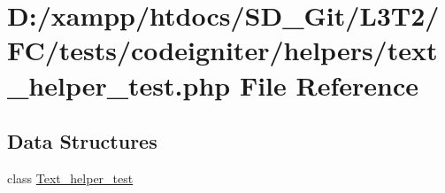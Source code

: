 \hypertarget{tests_2codeigniter_2helpers_2text__helper__test_8php}{}\section{D\+:/xampp/htdocs/\+S\+D\+\_\+\+Git/\+L3\+T2/\+F\+C/tests/codeigniter/helpers/text\+\_\+helper\+\_\+test.php File Reference}
\label{tests_2codeigniter_2helpers_2text__helper__test_8php}
\subsection*{Data Structures}
\begin{DoxyCompactItemize}
\item 
class \hyperlink{class_text__helper__test}{Text\+\_\+helper\+\_\+test}
\end{DoxyCompactItemize}
